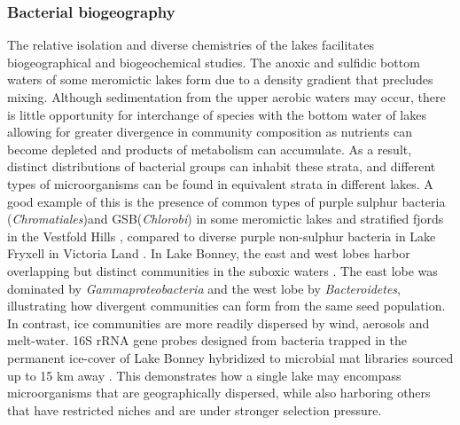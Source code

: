 \subsubsection{Bacterial biogeography}
The relative isolation and diverse chemistries of the lakes facilitates biogeographical and biogeochemical studies. 
The anoxic and sulfidic bottom waters of some meromictic lakes form due to a density gradient that precludes mixing. 
Although sedimentation from the upper aerobic waters may occur, 
there is little opportunity for interchange of species with the bottom water of lakes allowing for greater divergence in community composition as nutrients can become depleted 
and products of metabolism can accumulate.
As a result, distinct distributions of bacterial groups can inhabit these strata, and different types of microorganisms can be found in equivalent strata in different lakes. 
A good example of this is the presence of common types of purple sulphur bacteria (\emph{Chromatiales})and \ac{GSB}(\emph{Chlorobi}) 
in some meromictic lakes and stratified fjords in the Vestfold Hills \cite{Burke1988},
compared to diverse purple non-sulphur bacteria in Lake Fryxell in Victoria Land \cite{Karr2003}. 
In Lake Bonney, the east and west lobes harbor overlapping but distinct communities in the suboxic waters \cite{Glatz2006}.
The east lobe was dominated by \emph{Gammaproteobacteria} and the west lobe by \emph{Bacteroidetes}, illustrating how divergent communities can form from the same seed population. 
In contrast, ice communities are more readily dispersed by wind, aerosols and melt-water. 
16S \ac{rRNA} gene probes designed from bacteria trapped in the permanent ice-cover of Lake Bonney hybridized to microbial mat libraries sourced up to 15 km away \cite{Gordon2000}.
This demonstrates how a single lake may encompass microorganisms that are geographically dispersed, while also harboring others that have restricted niches and are under stronger selection pressure.


